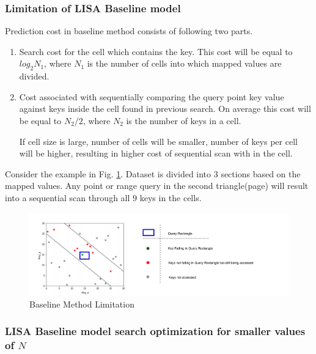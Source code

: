 \subsubsection{Limitation of LISA Baseline model}

Prediction cost in baseline method consists of following two parts.

\begin{enumerate}
	\item Search cost for the cell which contains the key. This cost will be equal to $log_{2}N_{1}$, where $N_{1}$ is the number of cells into which mapped values are divided.
	
	\item Cost associated with sequentially comparing the query point key value against keys inside the cell found in previous search. On average this cost will be equal to $N_{2}\slash2$, where $N_{2}$ is the number of keys in a cell.   
	
If cell size is large, number of cells will be smaller, number of keys per cell will be higher, resulting in higher cost of sequential scan with in the cell. 
\end{enumerate}

Consider the example in Fig. \ref{fig:BaseLine_Method_Limitation}. Dataset is divided into $3$ sections based on the mapped values. Any point or range query in the second triangle(page) will result into a sequential scan through all $9$ keys in the cells.

\begin{figure}[!htb]
    \centering
    \includegraphics[width=\textwidth]{graphs/Baseline_limitation.pdf}
    \caption{Baseline Method Limitation }
    \label{fig:BaseLine_Method_Limitation}
\end{figure}



\subsubsection {LISA Baseline model search optimization for smaller values of $N$}

